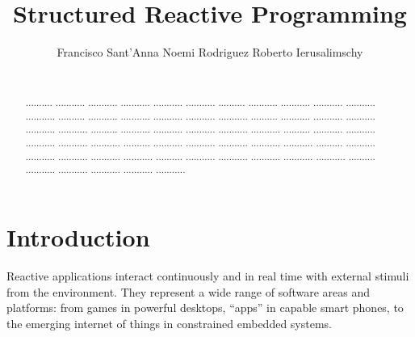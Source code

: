 \documentclass{acm_proc_article-sp}
\newcommand{\1}{\;}
\newcommand{\2}{\;\;}
\newcommand{\3}{\;\;\;}
\newcommand{\5}{\;\;\;\;\;}
\begin{document}
\title {
    Structured Reactive Programming
}

\author{
    \alignauthor
    Francisco Sant'Anna \hspace{1cm} Noemi Rodriguez \hspace{1cm} Roberto Ierusalimschy   \\
     \\
}

\maketitle

\begin{abstract}
.......... ........... ........... ........... ........... ...........
.......... ........... ........... ........... ........... ...........
.......... ........... ........... ........... ........... ...........
.......... ........... ........... ........... ........... ...........
.......... ........... ........... ........... ........... ...........
.......... ........... ........... ........... ........... ...........
.......... ........... ........... ........... ........... ...........
.......... ........... ........... ........... ........... ...........
.......... ........... ........... ........... ........... ...........
.......... ........... ........... ........... ........... ...........
\end{abstract}




\section{Introduction}
\label{sec.intro}

Reactive applications interact continuously and in real time with external 
stimuli from the environment.
They represent a wide range of software areas and platforms: from games in 
powerful desktops, ``apps'' in capable smart phones, to the emerging internet 
of things in constrained embedded systems.
\end{document}
